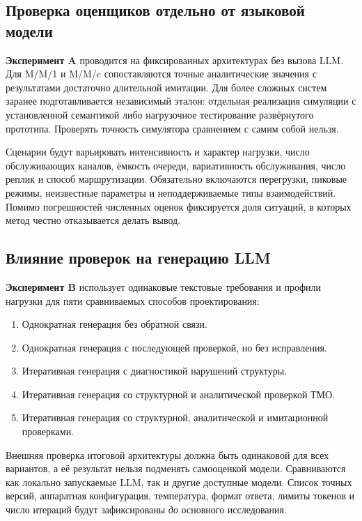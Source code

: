 \subsection{Проверка оценщиков отдельно от языковой модели}

\textbf{Эксперимент A} проводится на фиксированных архитектурах без вызова LLM. Для M/M/1 и M/M/c сопоставляются точные аналитические значения с результатами достаточно длительной имитации. Для более сложных систем заранее подготавливается независимый эталон: отдельная реализация симуляции с установленной семантикой либо нагрузочное тестирование развёрнутого прототипа. Проверять точность симулятора сравнением с самим собой нельзя.

Сценарии будут варьировать интенсивность и характер нагрузки, число обслуживающих каналов, ёмкость очереди, вариативность обслуживания, число реплик и способ маршрутизации. Обязательно включаются перегрузки, пиковые режимы, неизвестные параметры и неподдерживаемые типы взаимодействий. Помимо погрешностей численных оценок фиксируется доля ситуаций, в которых метод честно отказывается делать вывод.

\subsection{Влияние проверок на генерацию LLM}

\textbf{Эксперимент B} использует одинаковые текстовые требования и профили нагрузки для пяти сравниваемых способов проектирования:
\begin{enumerate}
    \item Однократная генерация без обратной связи.
    \item Однократная генерация с последующей проверкой, но без исправления.
    \item Итеративная генерация с диагностикой нарушений структуры.
    \item Итеративная генерация со структурной и аналитической проверкой ТМО.
    \item Итеративная генерация со структурной, аналитической и имитационной проверками.
\end{enumerate}

Внешняя проверка итоговой архитектуры должна быть одинаковой для всех вариантов, а её результат нельзя подменять самооценкой модели. Сравниваются как локально запускаемые LLM, так и другие доступные модели. Список точных версий, аппаратная конфигурация, температура, формат ответа, лимиты токенов и число итераций будут зафиксированы \emph{до} основного исследования.

